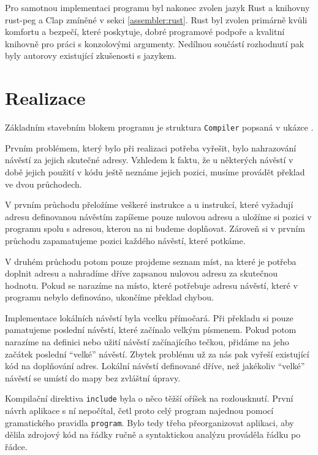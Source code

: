 Pro samotnou implementaci programu byl nakonec zvolen jazyk Rust a knihovny rust-peg a Clap zmíněné v sekci \ref{assembler:rust}. Rust byl zvolen primárně kvůli komfortu a bezpečí, které poskytuje, dobré programové podpoře a kvalitní knihovně pro práci s konzolovými argumenty. Nedílnou součástí rozhodnutí pak byly autorovy existující zkušenosti s jazykem.


\section{Realizace}

Základním stavebním blokem programu je struktura \texttt{Compiler} popsaná v ukázce . 


Prvním problémem, který bylo při realizaci potřeba vyřešit, bylo nahrazování návěstí za jejich skutečné adresy. Vzhledem k faktu, že u některých návěstí v době jejich použití v kódu ještě neznáme jejich pozici, musíme provádět překlad ve dvou průchodech.

V prvním průchodu přeložíme veškeré instrukce a u instrukcí, které vyžadují adresu definovanou návěstím zapíšeme pouze nulovou adresu a uložíme si pozici v programu spolu s adresou, kterou na ni budeme doplňovat. Zároveň si v prvním průchodu zapamatujeme pozici každého návěstí, které potkáme.

V druhém průchodu potom pouze projdeme seznam míst, na které je potřeba doplnit adresu a nahradíme dříve zapsanou nulovou adresu za skutečnou hodnotu. Pokud se narazíme na místo, které potřebuje adresu návěstí, které v programu nebylo definováno, ukončíme překlad chybou.


Implementace lokálních návěstí byla vcelku přímočará. Při překladu si pouze pamatujeme poslední návěstí, které začínalo velkým písmenem. Pokud potom narazíme na definici nebo užití návěstí začínajícího tečkou, přidáme na jeho začátek poslední ``velké'' návěstí. Zbytek problému už za nás pak vyřeší existující kód na doplňování adres. Lokální návěstí definované dříve, než jakékoliv ``velké'' návěstí se umístí do mapy bez zvláštní úpravy.

Kompilační direktiva \texttt{include} byla o něco těžší oříšek na rozlousknutí. První návrh aplikace s ní nepočítal, četl proto celý program najednou pomocí gramatického pravidla \texttt{program}. Bylo tedy třeba přeorganizovat aplikaci, aby dělila zdrojový kód na řádky ručně a syntaktickou analýzu prováděla řádku po řádce.

